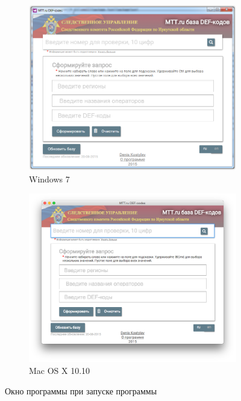 \begin{figure}[H]
	\centering
	\begin{subfigure}[r]{0.45\textwidth}
		\includegraphics[width=\textwidth]{pics/screens/win_main.png}
		\caption{Windows 7}
	\end{subfigure}
	\quad
	\begin{subfigure}[l]{0.45\textwidth}
		\includegraphics[width=\textwidth]{pics/screens/mac_main.png}
		\caption{Mac OS X 10.10}
	\end{subfigure}
	\caption{Окно программы при запуске программы}
	\label{fig:mainscreen}
\end{figure}

